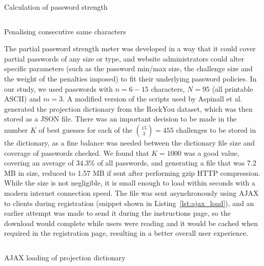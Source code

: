   \begin{listing}[htpb]
    \inputminted[linenos,frame=lines,baselinestretch=0.75,fontsize=\footnotesize]{js}{Snippets/calc_str.js}
    \caption{Calculation of password strength}
    \label{lst:calc_str}
  \end{listing}

  \begin{listing}[htpb]
    \inputminted[linenos,frame=lines,baselinestretch=0.75,fontsize=\footnotesize]{js}{Snippets/get_penalty.js}
    \caption{Penalising consecutive same characters}
    \label{lst:penalty}
  \end{listing}

  The partial password strength meter was developed in a way that it could cover partial passwords of any size or type, and website administrators could alter specific parameters (such as the password min/max size, the challenge size and the weight of the penalties imposed) to fit their underlying password policies. In our study, we used passwords with $n=6-15$ characters, $N=95$ (all printable ASCII) and $m=3$.
  A modified version of the scripts used by Aspinall et al.~\cite{part_pass} generated the projection dictionary from the RockYou dataset, which was then stored as a JSON file. There was an important decision to be made in the number $K$ of best guesses for each of the ${15 \choose 3} = 455$ challenges to be stored in the dictionary, as a fine balance was needed between the dictionary file size and coverage of passwords checked. We found that $K=1000$ was a good value, covering an average of 34.3\% of all passwords, and generating a file that was 7.2 MB in size, reduced to 1.57 MB if sent after performing gzip HTTP compression. While the size is not negligible, it is small enough to load within seconds with a modern internet connection speed. The file was sent asynchronously using AJAX to clients during registration (snippet shown in Listing~\ref{lst:ajax_load}), and an earlier attempt was made to send it during the instructions page, so the download would complete while users were reading and it would be cached when required in the registration page, resulting in a better overall user experience.

  \begin{listing}[htpb]
    \inputminted[linenos,frame=single,baselinestretch=0.75,fontsize=\footnotesize]{js}{Snippets/ajax.js}
    \caption{AJAX loading of projection dictionary}
    \label{lst:ajax_load}
  \end{listing}

